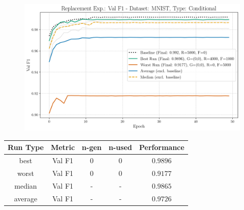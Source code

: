 \begin{figure}[htbp]
	\centering
	\includegraphics[width=.85\textwidth]{abb/strat_classifier_performance/MNIST_STRATIFIED_CLASSIFIERS_COND_GAN/replacement_experiments/val_f1_score_['COND']_MNIST_all.png}
	\label{fig:app_strat_class_performance_replacement_exp._val_f1_score_}
\end{figure}
\begin{table}[H]
	\centering
	\vspace{-1em}
	\begin{tabular}{|c|c|c|c|c|}
		\hline
		Run Type & Metric & n-gen & n-used & Performance \\ \hline
		best & Val F1 & 0 & 0 & $0.9896$\\ \hline
		worst & Val F1 & 0 & 0 & $0.9177$\\ \hline
		median & Val F1 & - & - & $0.9865$\\ \hline
		average & Val F1 & - & - & $0.9726$
		\\ \hline
	\end{tabular}
\end{table}
\newpage
